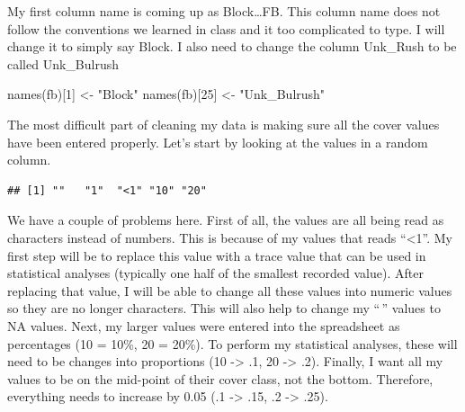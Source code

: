 \documentclass[
]{book}
\newenvironment{Shaded}{\begin{snugshade}}{\end{snugshade}}
\newcommand{\DecValTok}[1]{\textcolor[rgb]{0.00,0.00,0.81}{#1}}
\newcommand{\FunctionTok}[1]{\textcolor[rgb]{0.00,0.00,0.00}{#1}}
\newcommand{\NormalTok}[1]{#1}
\newcommand{\OtherTok}[1]{\textcolor[rgb]{0.56,0.35,0.01}{#1}}
\newcommand{\SpecialCharTok}[1]{\textcolor[rgb]{0.00,0.00,0.00}{#1}}
\newcommand{\StringTok}[1]{\textcolor[rgb]{0.31,0.60,0.02}{#1}}
\begin{document}
My first column name is coming up as Block\ldots FB. This column name does not follow the conventions we learned in class and it too complicated to type. I will change it to simply say Block. I also need to change the column Unk\_Rush to be called Unk\_Bulrush

\begin{Shaded}
\begin{Highlighting}[]
\FunctionTok{names}\NormalTok{(fb)[}\DecValTok{1}\NormalTok{] }\OtherTok{\textless{}{-}} \StringTok{"Block"}
\FunctionTok{names}\NormalTok{(fb)[}\DecValTok{25}\NormalTok{] }\OtherTok{\textless{}{-}} \StringTok{"Unk\_Bulrush"}
\end{Highlighting}
\end{Shaded}

The most difficult part of cleaning my data is making sure all the cover values have been entered properly. Let's start by looking at the values in a random column.

\begin{Shaded}
\end{Shaded}

\begin{verbatim}
## [1] ""   "1"  "<1" "10" "20"
\end{verbatim}

We have a couple of problems here. First of all, the values are all being read as characters instead of numbers. This is because of my values that reads ``\textless1''. My first step will be to replace this value with a trace value that can be used in statistical analyses (typically one half of the smallest recorded value). After replacing that value, I will be able to change all these values into numeric values so they are no longer characters. This will also help to change my ``\,'' values to NA values. Next, my larger values were entered into the spreadsheet as percentages (10 = 10\%, 20 = 20\%). To perform my statistical analyses, these will need to be changes into proportions (10 -\textgreater{} .1, 20 -\textgreater{} .2). Finally, I want all my values to be on the mid-point of their cover class, not the bottom. Therefore, everything needs to increase by 0.05 (.1 -\textgreater{} .15, .2 -\textgreater{} .25).
\end{document}
